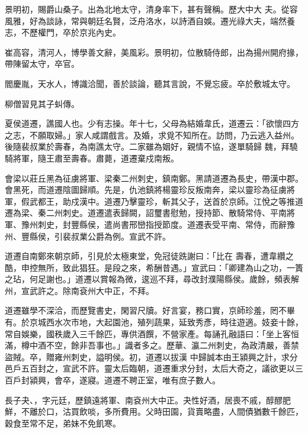 \begin{pinyinscope}
 景明初，賜爵山桑子。出為北地太守，清身率下，甚有聲稱。歷大中大
 夫。從容風雅，好為談詠，常與朝廷名賢，泛舟洛水，以詩酒自娛。遷光祿大夫，端然養志，不歷權門，卒於京兆內史。



 崔高容，清河人，博學善文辭，美風彩。景明初，位散騎侍郎，出為揚州開府掾，帶陳留太守，卒官。



 閻慶胤，天水人，博識洽聞，善於談論，聽其言說，不覺忘疲。卒於敷城太守。



 柳僧習見其子虯傳。



 夏侯道遷，譙國人也。少有志操。年十七，父母為結婚韋氏，道遷云：「欲懷四方之志，不願取婦。」家人咸謂戲言。及婚，求覓不知所在。訪問，乃云逃入益州。後隨裴叔業於壽春，為南譙太守。二家雖為姻好，親情不協，遂單騎歸
 魏，拜驍騎將軍，隨王肅至壽春。肅薨，道遷棄戍南叛。



 會梁以莊丘黑為征虜將軍、梁秦二州刺史，鎮南鄭。黑請道遷為長史，帶漢中郡。會黑死，而道遷陰圖歸順。先是，仇池鎮將楊靈珍反叛南奔，梁以靈珍為征虜將軍，假武都王，助戍漢中。道遷乃擊靈珍，斬其父子，送首於京師。江悅之等推道遷為梁、秦二州刺史。道遷遣表歸闕，詔璽書慰勉，授持節、散騎常侍、平南將軍、豫州刺史，封豐縣侯，遣尚書邢巒指授節度。道遷表受平南、常侍，而辭豫州、豐縣侯，引裴叔業公爵為例。宣武不許。



 道遷自南鄭來朝京師，引見於太極東堂，免冠徒跣謝曰：「比在
 壽春，遭韋纘之酷，申控無所，致此猖狂。是段之來，希酬昔遇。」宣武曰：「卿建為山之功，一簣之玷，何足謝也。」道遷以賞報為微，逡巡不拜，尋改封濮陽縣侯。歲餘，頻表解州，宣武許之。除南袞州大中正，不拜。



 道遷雖學不深洽，而歷覽書史，閑習尺牘。好言宴，務口實，京師珍羞，罔不畢有。於京城西水次市地，大起園池，殖列蔬果，延致秀彥，時往遊適。妓妾十餘，常自娛樂，國秩歲入三千餘匹，專供酒饌，不營家產。每誦孔融語曰：「坐上客恒滿，樽中酒不空，餘非吾事也。」識者多之。歷華、瀛二州刺史，為政清嚴，善禁盜賊。卒，贈雍州刺史，謚明侯。初，道遷以拔漢
 中歸誠本由王潁興之計，求分邑戶五百封之，宣武不許。靈太后臨朝，道遷重求分封，太后大奇之，議欲更以三百戶封潁興，會卒，遂寢。道遷不聘正室，唯有庶子數人。



 長子夬、，字元廷，歷鎮遠將軍、南袞州大中正。夬性好酒，居喪不戚，醇醪肥鮮，不離於口，沽買飲啖，多所費用。父時田園，貨賣略盡，人間債猶數千餘匹，穀食至常不足，弟妹不免飢寒。




\end{pinyinscope}
